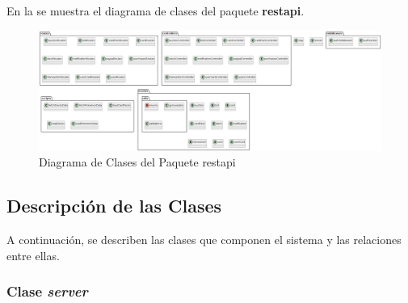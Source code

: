 En la  se muestra el diagrama de clases del paquete \textbf{restapi}.
\begin{figure}[H]
    \hypertarget{fig:6_6_Diagrama-Clases}{}
    \centering
    \includegraphics[width=1\linewidth]{figures/6-Analisis/6-Clases/6_6_Clases-restapi.png}
    \caption{Diagrama de Clases del Paquete restapi}
    \label{fig:6_6_Diagrama-Clases}
\end{figure}


\subsection{Descripción de las Clases} \hypertarget{sec:6_6_3-Descripcion-Clases}{} \label{sec:6_6_3-Descripcion-Clases}
A continuación, se describen las clases que componen el sistema y las relaciones entre ellas.
\subsubsection{Clase \textit{server}}

